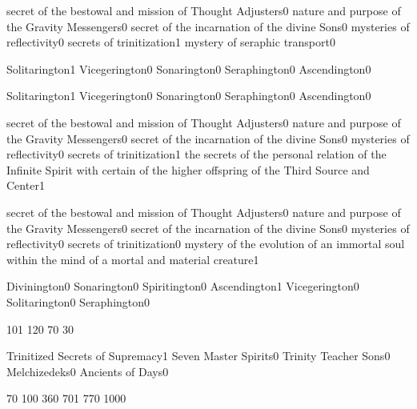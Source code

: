 {secret of the bestowal and mission of Thought Adjusters}{0}
{nature and purpose of the Gravity Messengers}{0}
{secret of the incarnation of the divine Sons}{0}
{mysteries of reflectivity}{0}
{secrets of trinitization}{1}
{mystery of seraphic transport}{0}
\qstop

{Solitarington}{1}
{Vicegerington}{0}
{Sonarington}{0}
{Seraphington}{0}
{Ascendington}{0}
\qstop

{Solitarington}{1}
{Vicegerington}{0}
{Sonarington}{0}
{Seraphington}{0}
{Ascendington}{0}
\qstop

{secret of the bestowal and mission of Thought Adjusters}{0}
{nature and purpose of the Gravity Messengers}{0}
{secret of the incarnation of the divine Sons}{0}
{mysteries of reflectivity}{0}
{secrets of trinitization}{1}
{the secrets of the personal relation of the Infinite Spirit with certain of the higher offspring of the Third Source and Center}{1}
\qstop

{secret of the bestowal and mission of Thought Adjusters}{0}
{nature and purpose of the Gravity Messengers}{0}
{secret of the incarnation of the divine Sons}{0}
{mysteries of reflectivity}{0}
{secrets of trinitization}{0}
{mystery of the evolution of an immortal soul within the mind of a mortal and material creature}{1}
\qstop

{Divinington}{0}
{Sonarington}{0}
{Spiritington}{0}
{Ascendington}{1}
{Vicegerington}{0}
{Solitarington}{0}
{Seraphington}{0}
\qstop

{10}{1}
{12}{0}
{7}{0}
{3}{0}
\qstop

{Trinitized Secrets of Supremacy}{1}
{Seven Master Spirits}{0}
{Trinity Teacher Sons}{0}
{Melchizedeks}{0}
{Ancients of Days}{0}
\qstop


{7}{0}
{10}{0}
{36}{0}
{70}{1}
{77}{0}
{100}{0}
\qstop

